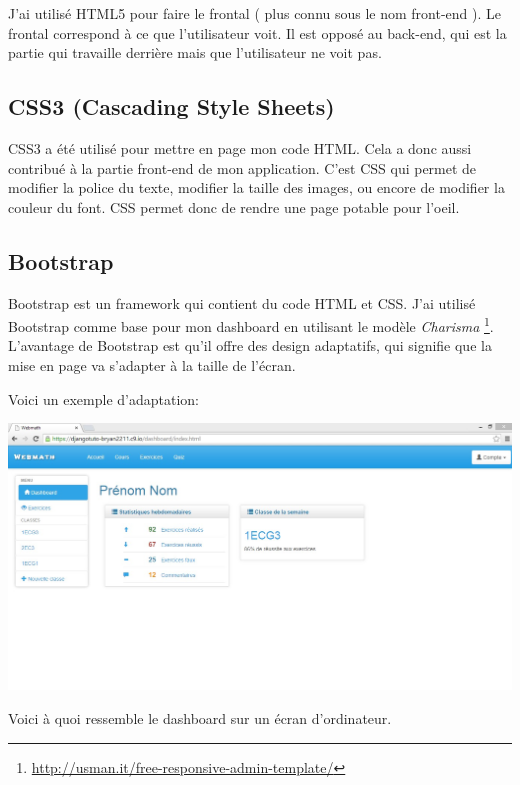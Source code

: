 \documentclass[letterpaper,10pt,french]{sphinxmanual}
\begin{document}
J'ai utilisé HTML5 pour faire le frontal ( plus connu sous le nom front-end ).
Le frontal correspond à ce que l'utilisateur voit. Il est opposé au back-end,
qui est la partie qui travaille derrière mais que l'utilisateur ne voit pas.


\subsection{CSS3 (Cascading Style Sheets)}
\label{documentation:css3-cascading-style-sheets}
CSS3 a été utilisé pour mettre en page mon code HTML. Cela a donc aussi
contribué à la partie front-end de mon application. C'est CSS qui permet de
modifier la police du texte, modifier la taille des images, ou encore
de modifier la couleur du font. CSS permet donc de rendre une page potable
pour l'oeil.


\subsection{Bootstrap}
\label{documentation:bootstrap}
Bootstrap est un framework qui contient du code HTML et CSS. J'ai utilisé
Bootstrap comme base pour mon dashboard en utilisant le modèle \emph{Charisma}
\footnote{
\href{http://usman.it/free-responsive-admin-template/}{http://usman.it/free-responsive-admin-template/}
}. L'avantage de Bootstrap est qu'il offre des
design adaptatifs, qui signifie que la mise en page va s'adapter à la taille de
l'écran.

Voici un exemple d'adaptation:

\includegraphics{source/images/fullscreen.png}

Voici à quoi ressemble le dashboard sur un écran d'ordinateur.
\end{document}
